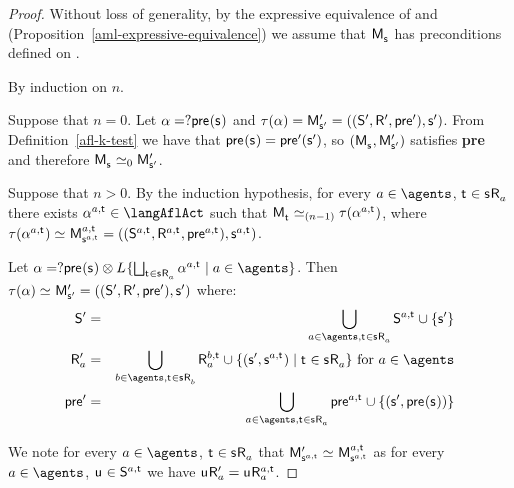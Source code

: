 \begin{proof}
Without loss of generality, by the expressive equivalence of \logicAmlK{} and \logicK{} (Proposition~\ref{aml-expressive-equivalence}) we assume that $\aPModel{\aStateS}$ has preconditions defined on \langMl{}.

By induction on $n$.

Suppose that $n = 0$.
Let $\alpha = \test{\aPrecondition(\aStateS)}$ and $\tau(\alpha) = \aPModelP{\aStateSP} = \aPModelTupleP{\aStateSP}$.
From Definition~\ref{afl-k-test} we have that $\aPrecondition(\aStateS) = \aPreconditionP(\aStateSP)$, so $(\aPModel{\aStateS}, \aPModelP{\aStateSP})$ satisfies {\bf pre} and therefore $\aPModel{\aStateS} \bisimilar[0] \aPModelP{\aStateSP}$.

Suppose that $n > 0$. 
By the induction hypothesis, for every $\agentA \in \agents$, $\aStateT \in \aStateS \aAccessibility{\agentA}$ there exists $\alpha^{\agentA,\aStateT} \in \langAflAct$ such that $\aPModel{\aStateT} \bisimilar[(n - 1)] \tau(\alpha^{\agentA,\aStateT})$, where $\tau(\alpha^{\agentA,\aStateT}) \bisimilar \aPModel[\agentA,\aStateT]{\aStateS[\agentA,\aStateT]} = \aPModelTuple[\agentA,\aStateT]{\aStateS[\agentA,\aStateT]}$.

Let $\alpha = \test{\aPrecondition(\aStateS)} \compose \learns \{\bigchoice_{\aStateT \in \aStateS \aAccessibility{\agentA}} \alpha^{\agentA,\aStateT} \mid \agentA \in \agents\}$.
Then $\tau(\alpha) \bisimilar \aPModelP{\aStateSP} = \aPModelTupleP{\aStateSP}$ where:
\begin{eqnarray*}
    \aStatesP &=& \bigcup_{\agentA \in \agents, \aStateT \in \aStateS \aAccessibility{\agentA}} \aStates[\agentA,\aStateT] \cup \{\aStateSP\}\\
    \aAccessibilityP{\agentA} &=& \bigcup_{\agentB \in \agents, \aStateT \in \aStateS \aAccessibility{\agentB}} \aAccessibility[\agentB,\aStateT]{\agentA} \cup \{(\aStateSP, \aStateS[\agentA,\aStateT]) \mid \aStateT \in \aStateS \aAccessibility{\agentA}\} \text{ for } \agentA \in \agents\\
    \aPreconditionP &=& \bigcup_{\agentA \in \agents, \aStateT \in \aStateS \aAccessibility{\agentA}} \aPrecondition[\agentA,\aStateT] \cup \{(\aStateSP, \aPrecondition(\aStateS))\}
\end{eqnarray*}

We note for every $\agentA \in \agents$, $\aStateT \in \aStateS \aAccessibility{\agentA}$ that $\aPModelP{\aStateS[\agentA,\aStateT]} \bisimilar \aPModel[\agentA,\aStateT]{\aStateS[\agentA,\aStateT]}$ as for every $\agentA \in \agents$, $\aStateU \in \aStates[\agentA,\aStateT]$ we have $\aStateU \aAccessibilityP{\agentA} = \aStateU \aAccessibility[\agentA,\aStateT]{\agentA}$.


\end{proof}
